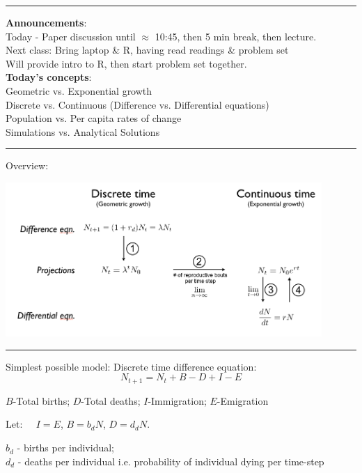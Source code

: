\documentclass{article}
\newcommand*\circled[1]{\tikz[baseline=(char.base)]{
            \node[shape=circle,draw,inner sep=2pt] (char) {#1};}}
\begin{document}
\noindent{}

\rule[0.5ex]{\linewidth}{1pt}
\textbf{Announcements}: \\
Today - Paper discussion until $\approx$ 10:45, then 5 min break, then lecture.\\
Next class: Bring laptop \& R, having read readings \& problem set \\
Will provide intro to R, then start problem set together.\\

\textbf{Today's concepts}: \\
Geometric vs. Exponential growth \\
Discrete vs. Continuous (Difference vs. Differential equations) \\
Population vs. Per capita rates of change \\
Simulations vs. Analytical Solutions

\rule[0.5ex]{\linewidth}{1pt}
Overview:
\begin{center}
\includegraphics[width=12cm]{figs/EqnConnections.png}
\end{center}
\rule[0.5ex]{\linewidth}{1pt}

\circled{1}
Simplest possible model: Discrete time difference equation:  
\begin{equation*}
N_{t+1}=N_t+B-D+I-E
\end{equation*}
\begin{center}
$B$-Total births; $D$-Total deaths; $I$-Immigration; $E$-Emigration
\end{center}

Let: $\;\;\;\ I=E$, $B=b_d N$, $D=d_d N$.
\begin{center}
	$b_d$ - births per individual; \\$d_d$ - deaths per individual i.e. probability of individual dying per time-step 
\end{center}
\end{document}
